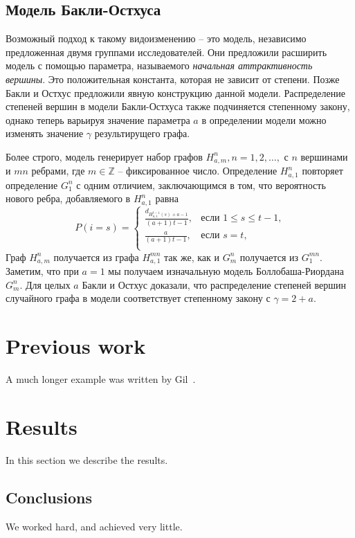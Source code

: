 \documentclass[14pt]{extreport}
\begin{document}
\section{Модель Бакли-Остхуса}
Возможный подход к такому видоизменению  -- это модель, независимо предложенная двумя группами исследователей. Они предложили расширить модель с помощью параметра, называемого {\it начальная аттрактивность вершины}. Это положительная константа, которая не зависит от степени. Позже Бакли и Остхус предложили явную конструкцию данной модели. Распределение степеней вершин в модели Бакли-Остхуса также подчиняется степенному закону, однако теперь варьируя значение параметра $a$ в определении модели можно изменять значение $\gamma$ результирущего графа.

Более строго, модель генерирует набор графов $H_{a, m}^n, n=1, 2,\dots,$ с $n$ вершинами и $mn$ ребрами, где $m \in \mathbb{Z}$ -- фиксированное число. Определение $H_{a, 1}^n$ повторяет определение $G_1^n$ с одним отличием, заключающимся в том, что вероятность нового ребра, добавляемого в $H_{a, 1}^n$ равна
$$  
P(i=s) =
\begin{cases}  
  \frac{d_{H_{a, 1}^{t-1}(s)+a-1}}{(a+1)t-1},&\text{если $1 \le s \le t-1$,}\\
  \frac{a}{(a+1)t-1},&\text{если $s=t$,}\\
\end{cases}
$$  
Граф $H_{a, m}^n$ получается из графа $H_{a, 1}^{mn}$ так же, как и $G_m^n$ получается из $G_1^{mn}$. Заметим, что при $a=1$ мы получаем изначальную модель Боллобаша-Риордана $G_m^n$. Для целых $a$ Бакли и Остхус доказали, что распределение степеней вершин случайного графа в модели соответствует степенному закону с $\gamma = 2 + a$.
 
\chapter{Previous work}\label{previous work}
A much longer \LaTeXe{} example was written by Gil~\cite{Gil:02}.

\chapter{Results}\label{results}
In this section we describe the results.

\section{Conclusions}\label{conclusions}
We worked hard, and achieved very little.
\end{document}

